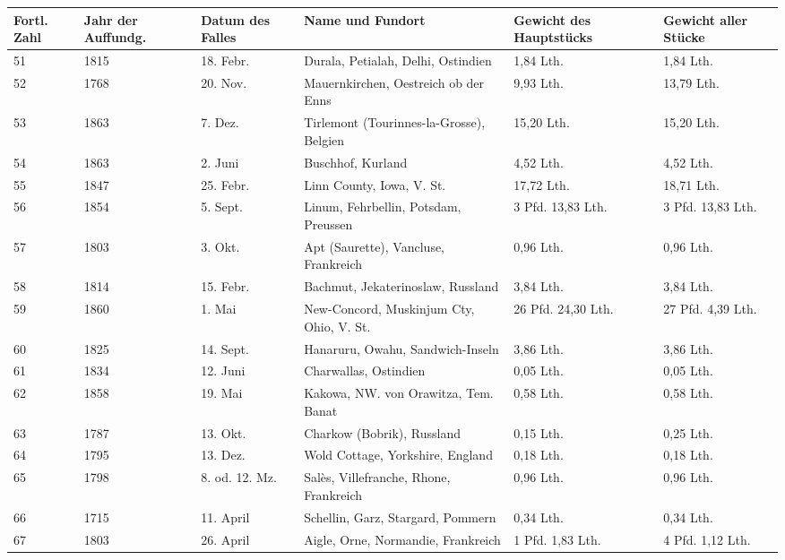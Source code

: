 \documentclass[a4paper, 11pt, oneside]{article}
\begin{document}
\begin{center}
\begin{footnotesize}
\begin{tabular}{ |p{7mm}|p{7mm}|p{13mm}|p{48mm}|p{22mm}|p{22mm}| }
    \hline
    Fortl. Zahl & Jahr der Auffundg. & Datum des Falles & Name und Fundort & Gewicht des Hauptstücks & Gewicht aller Stücke\\
    \hline\hline
    51 & 1815 & 18. Febr. & Durala, Petialah, Delhi, Ostindien & 1,84 Lth. & 1,84 Lth.\\\hline
    52 & 1768 & 20. Nov. & Mauernkirchen, Oestreich ob der Enns & 9,93 Lth. & 13,79 Lth.\\\hline
    53 & 1863 & 7. Dez. & Tirlemont (Tourinnes-la-Grosse), Belgien & 15,20 Lth. & 15,20 Lth.\\\hline
    54 & 1863 & 2. Juni & Buschhof, Kurland & 4,52 Lth. & 4,52 Lth.\\\hline
    55 & 1847 & 25. Febr. & Linn County, Iowa, V. St. & 17,72 Lth. & 18,71 Lth.\\\hline
    56 & 1854 & 5. Sept. & Linum, Fehrbellin, Potsdam, Preussen & 3 Pfd. 13,83 Lth. & 3 Pfd. 13,83 Lth.\\\hline
    57 & 1803 & 3. Okt. & Apt (Saurette), Vancluse, Frankreich & 0,96 Lth. & 0,96 Lth.\\\hline
    58 & 1814 & 15. Febr. & Bachmut, Jekaterinoslaw, Russland & 3,84 Lth. & 3,84 Lth.\\\hline
    59 & 1860 & 1. Mai & New-Concord, Muskinjum Cty, Ohio, V. St. & 26 Pfd. 24,30 Lth. & 27 Pfd. 4,39 Lth.\\\hline
    60 & 1825 & 14. Sept. & Hanaruru, Owahu, Sandwich-Inseln & 3,86 Lth. & 3,86 Lth.\\\hline
    61 & 1834 & 12. Juni & Charwallas, Ostindien & 0,05 Lth. & 0,05 Lth.\\\hline
    62 & 1858 & 19. Mai & Kakowa, NW. von Orawitza, Tem. Banat & 0,58 Lth. & 0,58 Lth.\\\hline
    63 & 1787 & 13. Okt. & Charkow (Bobrik), Russland & 0,15 Lth. & 0,25 Lth.\\\hline
    64 & 1795 & 13. Dez. & Wold Cottage, Yorkshire, England & 0,18 Lth. & 0,18 Lth.\\\hline
    65 & 1798 & 8. od. 12. Mz. & Salès, Villefranche, Rhone, Frankreich & 0,96 Lth. & 0,96 Lth.\\\hline
    66 & 1715 & 11. April & Schellin, Garz, Stargard, Pommern & 0,34 Lth. & 0,34 Lth.\\\hline
    67 & 1803 & 26. April & Aigle, Orne, Normandie, Frankreich & 1 Pfd. 1,83 Lth. & 4 Pfd. 1,12 Lth.\\\hline

\end{tabular}
\end{footnotesize}
\end{center}
\end{document}
